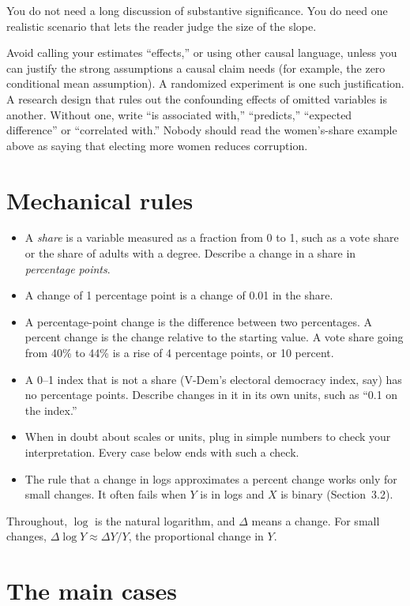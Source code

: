 \documentclass[11pt]{article}
\begin{document}
You do not need a long discussion of substantive significance. You do need one realistic scenario
that lets the reader judge the size of the slope.

Avoid calling your estimates ``effects,'' or using other causal language, unless you can justify
the strong assumptions a causal claim needs (for example, the zero conditional mean assumption). A
randomized experiment is one such justification. A research design that rules out the confounding
effects of omitted variables is another. Without one, write ``is associated with,'' ``predicts,''
``expected difference'' or ``correlated with.'' Nobody should read the women's-share example above
as saying that electing more women reduces corruption.

\section{Mechanical rules}

\begin{itemize}
\item A \emph{share} is a variable measured as a fraction from 0 to 1, such as a vote share or the
  share of adults with a degree. Describe a change in a share in \emph{percentage points}.
\item A change of 1 percentage point is a change of 0.01 in the share.
\item A percentage-point change is the difference between two percentages. A percent change is the
  change relative to the starting value. A vote share going from 40\% to 44\% is a rise of
  4 percentage points, or 10 percent.
\item A 0--1 index that is not a share (V-Dem's electoral democracy index, say) has no percentage
  points. Describe changes in it in its own units, such as ``0.1 on the index.''
\item When in doubt about scales or units, plug in simple numbers to check your interpretation.
  Every case below ends with such a check.
\item The rule that a change in logs approximates a percent change works only for small changes.
  It often fails when $Y$ is in logs and $X$ is binary (Section~3.2).
\end{itemize}

Throughout, $\log$ is the natural logarithm, and $\Delta$ means a change. For small changes,
$\Delta \log Y \approx \Delta Y / Y$, the proportional change in $Y$.

\section{The main cases}
\end{document}
